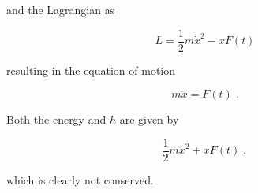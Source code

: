 \documentclass[12pt]{article}
\begin{document}
and the Lagrangian as 

\[ L = \frac{1}{2} m {\dot x}^2 - x F(t) \]

resulting in the equation of motion

\[ m {\ddot x} = F(t) \; .\]

Both the energy and $h$ are given by 

\[ \frac{1}{2} m {\dot x}^2 + x F(t) \; , \]

which is clearly not conserved.







 
\end{document}
